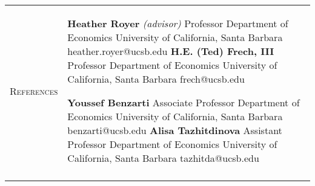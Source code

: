 \documentclass[11pt]{article}
\begin{document}
\begin{tabularx}{\textwidth}{@{}Y Z@{}}
		
	\textsc{References}  & 
	\begin{minipage}[t]{0.41\textwidth}
		\textbf{Heather Royer} \textit{(advisor)} \newline
		Professor \newline
		Department of Economics \newline
		University of California, Santa Barbara \newline
		heather.royer@ucsb.edu 
		\vspace{20pt} \newline
		\textbf{H.E. (Ted) Frech, III} \newline
		Professor \newline
		Department of Economics \newline
		University of California, Santa Barbara \newline
		frech@ucsb.edu
	\end{minipage}\begin{minipage}[t]{0.5\textwidth}
		\textbf{Youssef Benzarti}  \newline
		Associate Professor \newline
		Department of Economics \newline
		University of California, Santa Barbara \newline
		benzarti@ucsb.edu
		\vspace{20pt} \newline
		\textbf{Alisa Tazhitdinova} \newline
		Assistant Professor \newline
		Department of Economics \newline
		University of California, Santa Barbara \newline
		tazhitda@ucsb.edu
	\end{minipage}
	\newline  \\ \addlinespace[20pt] 
	

\end{tabularx}
\end{document}
